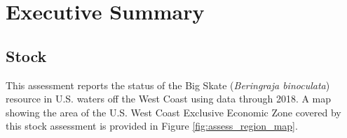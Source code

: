 \documentclass[12pt,]{article}
\begin{document}
\begin{center}
\renewcommand{\arraystretch}{1}

\maketitle

\setcounter{page}{1}
\end{center}

{
\setcounter{tocdepth}{4}
\tableofcontents
}
\setlength{\parskip}{5mm plus1mm minus1mm}
\pagebreak


\renewcommand{\thefigure}{\alph{figure}}
\renewcommand{\thetable}{\alph{table}}

\hypertarget{executive-summary}{%
\section*{Executive Summary}\label{executive-summary}}

\hypertarget{stock}{%
\subsection*{Stock}\label{stock}}

This assessment reports the status of the Big Skate
(\emph{Beringraja binoculata}) resource in U.S. waters off the West
Coast using data through 2018. A map showing the area of the U.S. West
Coast Exclusive Economic Zone covered by this stock assessment is
provided in Figure \ref{fig:assess_region_map}.
\end{document}
